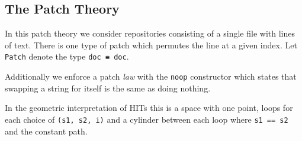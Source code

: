 \subsection{The Patch Theory}

In this patch theory we consider repositories consisting of a single file with lines of text.
There is one type of patch which permutes the line at a given index. Let \texttt{Patch} denote the type
\texttt{doc ≡ doc}.

Additionally we enforce a patch \emph{law} with the \texttt{noop} constructor which states that
swapping a string for itself is the same as doing nothing.

In the geometric interpretation of HITs this is a space with one point, loops for each choice of
\texttt{(s1, s2, i)} and a cylinder between each loop where \texttt{s1 == s2} and the constant path.
\begin{code}%
\>[0]\AgdaSpace{}%
\AgdaSpace{}%
\AgdaSymbol{:}\AgdaSpace{}%
\AgdaSpace{}%
\<%
\\
\>[0][@{}l@{\AgdaIndent{0}}]%
\>[2]\AgdaSpace{}%
\AgdaSymbol{:}\AgdaSpace{}%
\<%
\\
%
\>[2]\AgdaSpace{}%
\AgdaSymbol{:}\AgdaSpace{}%
\AgdaSymbol{(}\AgdaSpace{}%
\AgdaSpace{}%
\AgdaSymbol{:}\AgdaSpace{}%
\AgdaSymbol{)}\AgdaSpace{}%
\AgdaSymbol{(}\AgdaSpace{}%
\AgdaSymbol{:}\AgdaSpace{}%
\AgdaSpace{}%
\AgdaSymbol{)}\AgdaSpace{}%
\AgdaSpace{}%
\AgdaSymbol{(}\AgdaSpace{}%
\AgdaSpace{}%
\AgdaSymbol{)}\<%
\\
%
\>[2]\AgdaSpace{}%
\AgdaSymbol{:}\AgdaSpace{}%
\AgdaSymbol{(}\AgdaSpace{}%
\AgdaSymbol{:}\AgdaSpace{}%
\AgdaSymbol{)}\AgdaSpace{}%
\AgdaSymbol{(}\AgdaSpace{}%
\AgdaSymbol{:}\AgdaSpace{}%
\AgdaSpace{}%
\AgdaSymbol{)}\AgdaSpace{}%
\AgdaSpace{}%
\AgdaSpace{}%
\AgdaSpace{}%
\AgdaSpace{}%
\AgdaSpace{}%
\AgdaSpace{}%
\AgdaSpace{}%
\<%
\end{code}

